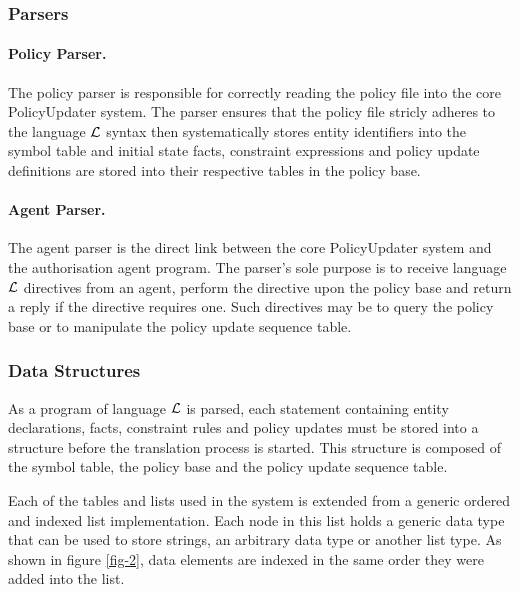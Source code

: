 \documentclass[10pt, twocolumn]{article}
\begin{document}
      \subsubsection{Parsers}

        \paragraph{Policy Parser.}

          The policy parser is responsible for correctly reading the policy
          file into the core PolicyUpdater system. The parser ensures that
          the policy file stricly adheres to the language $\cal{L}$ syntax
          then systematically stores entity identifiers into the symbol table
          and initial state facts, constraint expressions and policy update
          definitions are stored into their respective tables in the policy
          base.

        \paragraph{Agent Parser.}

          The agent parser is the direct link between the core PolicyUpdater
          system and the authorisation agent program. The parser's sole purpose
          is to receive language $\cal{L}$ directives from an agent, perform
          the directive upon the policy base and return a reply if the
          directive requires one. Such directives may be to query the policy
          base or to manipulate the policy update sequence table.

      \subsubsection{Data Structures}

        As a program of language ${\cal L}$ is parsed, each statement
        containing entity declarations, facts, constraint rules and policy
        updates must be stored into a structure before the translation process
        is started. This structure is composed of the symbol table, the policy
        base and the policy update sequence table.

        Each of the tables and lists used in the system is extended from a
        generic ordered and indexed list implementation. Each node in this list
        holds a generic data type that can be used to store strings, an
        arbitrary data type or another list type. As shown in figure \ref{fig-2},
        data elements are indexed in the same order they were added into the
        list.
\end{document}
